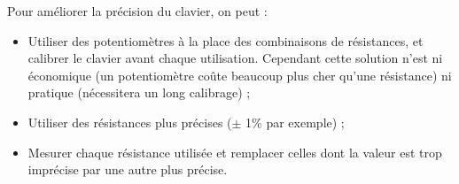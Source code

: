 Pour améliorer la précision du clavier, on peut :
\begin{itemize}
	\item Utiliser des potentiomètres à la place des combinaisons
	de résistances, et calibrer le clavier avant chaque utilisation.
	Cependant cette solution n'est ni économique (un potentiomètre
	coûte beaucoup plus cher qu'une résistance) ni pratique (nécessitera
	un long calibrage) ;
	\item Utiliser des résistances plus précises ($\pm$ 1\% par exemple) ;
	\item Mesurer chaque résistance utilisée et remplacer celles dont la
	valeur est trop imprécise par une autre plus précise.
\end{itemize}